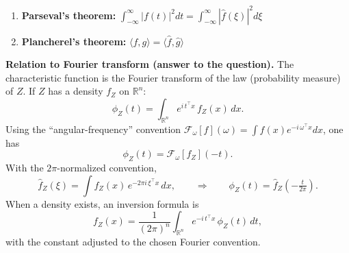 \documentclass[a4paper, 12pt]{article}
\begin{document}
\begin{answerenum}
\begin{enumerate}
                \item \textbf{Parseval's theorem:} $\int_{-\infty}^{\infty} |f(t)|^2 dt = \int_{-\infty}^{\infty} |\hat{f}(\xi)|^2 d\xi$
                
                \item \textbf{Plancherel's theorem:} $\langle f, g \rangle = \langle \hat{f}, \hat{g} \rangle$
            \end{enumerate}

            \textbf{Relation to Fourier transform (answer to the question).}
            The characteristic function is the Fourier transform of the law (probability measure) of $Z$. If $Z$ has a density $f_Z$ on $\mathbb{R}^n$:
            \[
              \phi_Z(t)=\int_{\mathbb{R}^n} e^{i\,t^\top x}\,f_Z(x)\,dx.
            \]
            Using the “angular-frequency” convention $\mathcal{F}_\omega[f](\omega)=\int f(x)e^{-i\,\omega^\top x}dx$, one has
            \[
              \phi_Z(t)=\mathcal{F}_\omega[f_Z](-t).
            \]
            With the $2\pi$-normalized convention,
            \[
              \hat f_Z(\xi)=\int f_Z(x)\,e^{-2\pi i\,\xi^\top x}\,dx,
              \qquad\Rightarrow\qquad
              \phi_Z(t)=\hat f_Z\!\left(-\tfrac{t}{2\pi}\right).
            \]
            When a density exists, an inversion formula is
            \[
              f_Z(x)=\frac{1}{(2\pi)^n}\int_{\mathbb{R}^n} e^{-i\,t^\top x}\,\phi_Z(t)\,dt,
            \]
            with the constant adjusted to the chosen Fourier convention.
    \end{answerenum}

    
\end{document}

